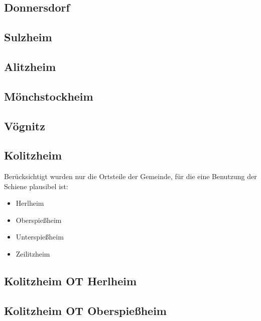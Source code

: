 \documentclass[fontsize=12pt,a4paper]{scrreprt}
\begin{document}
            \subsection{Donnersdorf}
            

            \subsection{Sulzheim}
            

            \subsection{Alitzheim}
            

            \subsection{Mönchstockheim}
            

            \subsection{Vögnitz}
            

            \subsection{Kolitzheim}
            Berücksichtigt wurden nur die Ortsteile der Gemeinde, für die eine Benutzung der Schiene plausibel ist:
            \begin{itemize}[nosep]
                \item Herlheim
                \item Oberspießheim
                \item Unterspießheim
                \item Zeilitzheim
            \end{itemize}

            \subsection{Kolitzheim OT Herlheim}
            

            \subsection{Kolitzheim OT Oberspießheim}
            
\end{document}
